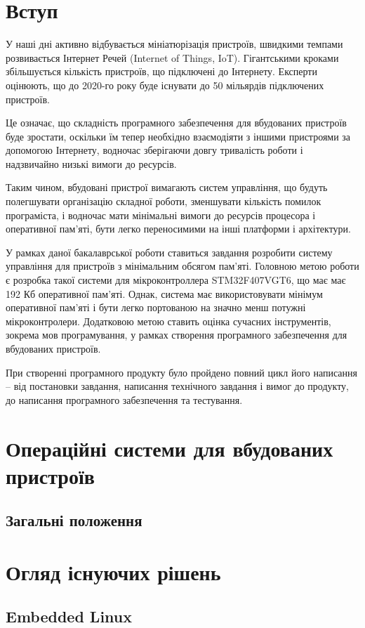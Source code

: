 \documentclass[oneside,14pt,a4paper,final]{myextreport}
\newcommand{\specialchapter}[1]{\chapter*{#1}\addcontentsline{toc}{chapter}{#1}}
\begin{document}
\specialchapter{Вступ}

У наші дні активно відбувається мініатюрізація пристроїв, швидкими темпами розвивається Інтернет Речей (Internet of Things, IoT). Гігантськими кроками збільшується кількість пристроїв, що підключені до Інтернету. Експерти оцінюють, що до 2020-го року буде існувати до 50 мільярдів підключених пристроїв\cite{dave-evans:IoT}.

Це означає, що складність програмного забезпечення для вбудованих пристроїв буде зростати, оскільки їм тепер необхідно взаємодіяти з іншими пристроями за допомогою Інтернету, водночас зберігаючи довгу тривалість роботи і надзвичайно низькі вимоги до ресурсів.

Таким чином, вбудовані пристрої вимагають систем управління, що будуть полегшувати організацію складної роботи, зменшувати кількість помилок програміста, і водночас мати мінімальні вимоги до ресурсів процесора і оперативної пам'яті, бути легко переносимими на інші платформи і архітектури.

У рамках даної бакалаврської роботи ставиться завдання розробити систему управління для пристроїв з мінімальним обсягом пам'яті. Головною метою роботи є розробка такої системи для мікроконтроллера STM32F407VGT6, що має має 192 Кб оперативної пам'яті. Однак, система має використовувати мінімум оперативної пам'яті і бути легко портованою на значно менш потужні мікроконтролери. Додатковою метою ставить оцінка сучасних інструментів, зокрема мов програмування, у рамках створення програмного забезпечення для вбудованих пристроїв.

При створенні програмного продукту було пройдено повний цикл його написання -- від постановки завдання, написання технічного завдання і вимог до продукту, до написання програмного забезпечення та тестування.

\chapter{Операційні системи для вбудованих пристроїв}
\section{Загальні положення}

\chapter{Огляд існуючих рішень}
\section{Embedded Linux}
\end{document}
